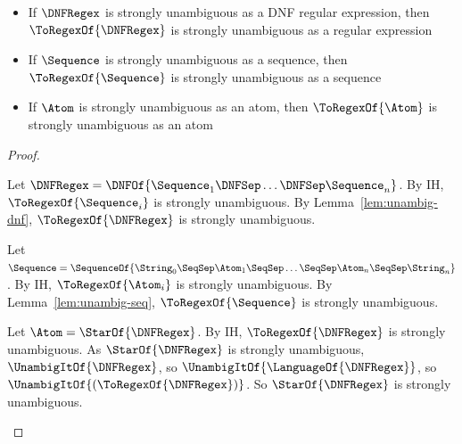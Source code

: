 \documentclass[acmsmall,screen]{acmart}
\begin{document}
\begin{mylemma}\leavevmode
  \label{lem:retaining-unambiguity-toregex}
  \begin{itemize}
  \item 
    If $\DNFRegex$ is strongly unambiguous as a DNF regular expression, then
    $\ToRegexOf{\DNFRegex}$ is strongly unambiguous as a regular expression
  \item
    If $\Sequence$ is strongly unambiguous as a sequence, then
    $\ToRegexOf{\Sequence}$ is strongly unambiguous as a sequence
  \item
    If $\Atom$ is strongly unambiguous as an atom, then
    $\ToRegexOf{\Atom}$ is strongly unambiguous as an atom
  \end{itemize}
\end{mylemma}
\begin{proof}
  \begin{case}[\MultiOrDNFRegexType{}]
    Let $\DNFRegex = \DNFOf{\Sequence_1 \DNFSep \ldots \DNFSep \Sequence_n}$.
    By IH, $\ToRegexOf{\Sequence_i}$ is strongly unambiguous.
    By Lemma~\ref{lem:unambig-dnf}, $\ToRegexOf{\DNFRegex}$ is strongly
    unambiguous.
  \end{case}

  \begin{case}[\MultiConcatSequenceType{}]
    Let $\Sequence = \SequenceOf{\String_0 \SeqSep \Atom_1 \SeqSep \ldots \SeqSep \Atom_n \SeqSep \String_n}$.
    By IH, $\ToRegexOf{\Atom_i}$ is strongly unambiguous.
    By Lemma~\ref{lem:unambig-seq}, $\ToRegexOf{\Sequence}$ is strongly
    unambiguous.
  \end{case}

  \begin{case}[StarAtomType]
    Let $\Atom = \StarOf{\DNFRegex}$.
    By IH, $\ToRegexOf{\DNFRegex}$ is strongly unambiguous.
    As $\StarOf{\DNFRegex}$ is strongly unambiguous, $\UnambigItOf{\DNFRegex}$,
    so $\UnambigItOf{\LanguageOf{\DNFRegex}}$, so
    $\UnambigItOf{(\ToRegexOf{\DNFRegex})}$.
    So $\StarOf{\DNFRegex}$ is strongly unambiguous.
  \end{case}
\end{proof}
\end{document}
